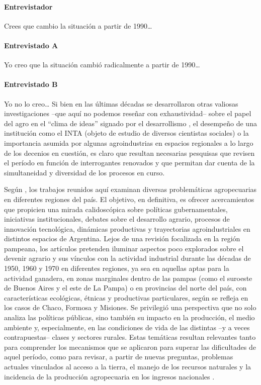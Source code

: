 \documentclass{article}
\begin{document}
\paragraph{Entrevistador} Crees que cambio la situación a partir de 1990…

\paragraph{Entrevistado A} Yo creo que la situación cambió radicalmente a partir de 1990…

\paragraph{Entrevistado B} Yo no lo creo…
Si bien en las últimas décadas se desarrollaron otras valiosas investigaciones –que aquí no podemos reseñar con exhaustividad– sobre el papel del agro en el “clima de ideas” signado por el desarrollismo \autocite{2835-TEOBALDO1946,2843-NELSON1912,2844-MERCANTE1908}, el desempeño de una institución como el INTA (objeto de estudio de diversos cientistas sociales) o la importancia asumida por algunas agroindustrias en espacios regionales a lo largo de los decenios en cuestión, es claro que resultan necesarias pesquisas que revisen el período en función de interrogantes renovados y que permitan dar cuenta de la simultaneidad y diversidad de los procesos en curso.

Según \textcite{2850-GONZALEZLEANDRI2006}, los trabajos reunidos aquí examinan diversas problemáticas agropecuarias en diferentes regiones del país. El objetivo, en definitiva, es ofrecer acercamientos que propicien una mirada calidoscópica sobre políticas gubernamentales, iniciativas institucionales, debates sobre el desarrollo agrario, procesos de innovación tecnológica, dinámicas productivas y trayectorias agroindustriales en distintos espacios de Argentina. Lejos de una revisión focalizada en la región pampeana, los artículos pretenden iluminar aspectos poco explorados sobre el devenir agrario y sus vínculos con la actividad industrial durante las décadas de 1950, 1960 y 1970 en diferentes regiones, ya sea en aquellas aptas para la actividad ganadera, en zonas marginales dentro de las pampas (como el suroeste de Buenos Aires y el este de La Pampa) o en provincias del norte del país, con características ecológicas, étnicas y productivas particulares, según se refleja en los casos de Chaco, Formosa y Misiones. Se privilegió una perspectiva que no solo analiza las políticas públicas, sino también su impacto en la producción, el medio ambiente y, especialmente, en las condiciones de vida de las distintas –y a veces contrapuestas– clases y sectores rurales. Estas temáticas resultan relevantes tanto para comprender los mecanismos que se aplicaron para superar las dificultades de aquel período, como para revisar, a partir de nuevas preguntas, problemas actuales vinculados al acceso a la tierra, el manejo de los recursos naturales y la incidencia de la producción agropecuaria en los ingresos nacionales \autocite[véase][pp. 45-48 para una discusión más extensa]{2850-GONZALEZLEANDRI2006}.
\end{document}
